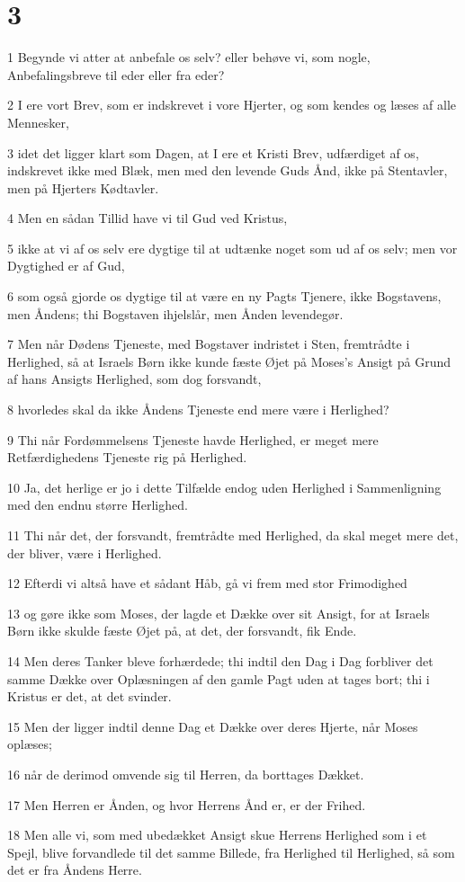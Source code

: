 \chapter{3}

\par 1 Begynde vi atter at anbefale os selv? eller behøve vi, som nogle, Anbefalingsbreve til eder eller fra eder?
\par 2 I ere vort Brev, som er indskrevet i vore Hjerter, og som kendes og læses af alle Mennesker,
\par 3 idet det ligger klart som Dagen, at I ere et Kristi Brev, udfærdiget af os, indskrevet ikke med Blæk, men med den levende Guds Ånd, ikke på Stentavler, men på Hjerters Kødtavler.
\par 4 Men en sådan Tillid have vi til Gud ved Kristus,
\par 5 ikke at vi af os selv ere dygtige til at udtænke noget som ud af os selv; men vor Dygtighed er af Gud,
\par 6 som også gjorde os dygtige til at være en ny Pagts Tjenere, ikke Bogstavens, men Åndens; thi Bogstaven ihjelslår, men Ånden levendegør.
\par 7 Men når Dødens Tjeneste, med Bogstaver indristet i Sten, fremtrådte i Herlighed, så at Israels Børn ikke kunde fæste Øjet på Moses's Ansigt på Grund af hans Ansigts Herlighed, som dog forsvandt,
\par 8 hvorledes skal da ikke Åndens Tjeneste end mere være i Herlighed?
\par 9 Thi når Fordømmelsens Tjeneste havde Herlighed, er meget mere Retfærdighedens Tjeneste rig på Herlighed.
\par 10 Ja, det herlige er jo i dette Tilfælde endog uden Herlighed i Sammenligning med den endnu større Herlighed.
\par 11 Thi når det, der forsvandt, fremtrådte med Herlighed, da skal meget mere det, der bliver, være i Herlighed.
\par 12 Efterdi vi altså have et sådant Håb, gå vi frem med stor Frimodighed
\par 13 og gøre ikke som Moses, der lagde et Dække over sit Ansigt, for at Israels Børn ikke skulde fæste Øjet på, at det, der forsvandt, fik Ende.
\par 14 Men deres Tanker bleve forhærdede; thi indtil den Dag i Dag forbliver det samme Dække over Oplæsningen af den gamle Pagt uden at tages bort; thi i Kristus er det, at det svinder.
\par 15 Men der ligger indtil denne Dag et Dække over deres Hjerte, når Moses oplæses;
\par 16 når de derimod omvende sig til Herren, da borttages Dækket.
\par 17 Men Herren er Ånden, og hvor Herrens Ånd er, er der Frihed.
\par 18 Men alle vi, som med ubedækket Ansigt skue Herrens Herlighed som i et Spejl, blive forvandlede til det samme Billede, fra Herlighed til Herlighed, så som det er fra Åndens Herre.

